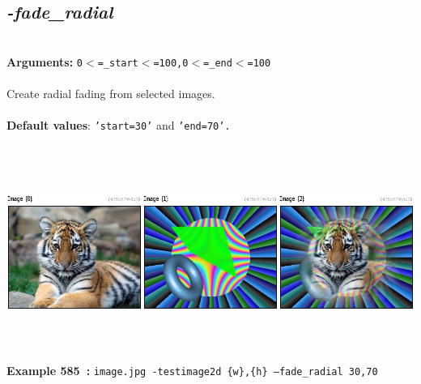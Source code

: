 \documentclass[a4paper,11pt,twoside]{book}
\begin{document}
\subsection{\emph{-fade\_radial} }\vspace*{-0.5em}
~\\\textbf{Arguments: } 
{\small \texttt{0$<$=\_start$<$=100,0$<$=\_end$<$=100}}\\~\\
Create radial fading from selected images.
~\\~\\\textbf{Default values}: {\small \texttt{'start=30'} and \texttt{'end=70'.}}
\begin{center}\includegraphics[keepaspectratio=true,height=7cm,width=\textwidth]{img/gmic_def585.jpg}\\
{\footnotesize \textbf{Example 585~:} \texttt{image.jpg -testimage2d \{w\},\{h\} --fade\_radial 30,70}}
\end{center}
\end{document}
